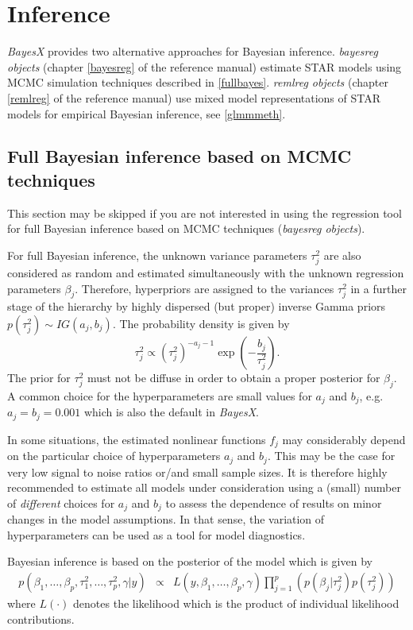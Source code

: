 \documentclass[11pt,a4paper,twoside]{bayesxarticle}
\begin{document}
\section{Inference}
\label{inference}

{\em BayesX} provides two alternative approaches for Bayesian
inference. {\em bayesreg objects} (chapter \ref*{bayesreg} of the
reference manual) estimate STAR models using MCMC simulation
techniques described in \autoref{fullbayes}. {\em remlreg objects}
(chapter \ref*{remlreg} of the reference manual) use mixed model
representations of STAR models for empirical Bayesian inference, see
\autoref{glmmmeth}.



\subsection{Full Bayesian inference based on MCMC techniques}
\label{fullbayes}

This section may be skipped if you are not interested in using the
regression tool for full Bayesian inference based on MCMC techniques
({\em bayesreg objects}).

For full Bayesian inference, the unknown variance parameters
$\tau_j^2$ are also considered as random and estimated
simultaneously with the unknown regression parameters $\beta_j$.
Therefore, hyperpriors are assigned to the variances $\tau^2_j$
in a further stage of the hierarchy by highly dispersed (but
proper) inverse Gamma priors $p(\tau^2_j) \sim IG(a_j,b_j)$. The
probability density is given by
$$
\tau_j^2 \propto (\tau^2_j)^{-a_j-1}
\exp\left(-\frac{b_j}{\tau^2_j}\right).
$$
The prior for $\tau_j^2$ must not be diffuse in order to obtain a
proper posterior for $\beta_j$. A common choice for the
hyperparameters are small values for $a_j$ and $b_j$, e.g.
$a_j=b_j=0.001$ which is also the default in {\em BayesX}.

In some situations, the estimated nonlinear functions $f_j$ may
considerably depend on the particular choice of hyperparameters
$a_j$ and $b_j$. This may be the case for very low signal to noise
ratios or/and small sample sizes. It is therefore highly
recommended to estimate all models under consideration using a
(small) number of {\em different} choices for $a_j$ and $b_j$ to
assess the dependence of results on minor changes in the model
assumptions. In that sense, the variation of hyperparameters can
be used as a tool for model diagnostics.


Bayesian inference is based on the posterior of the model which is
given by
\begin{equation}
\label{posterior}
\begin{array}{lll}
 p(\beta_1,\dots,\beta_p,\tau^2_1,\dots,\tau^2_p,\gamma|y) & \propto & L(y,\beta_1,\dots,\beta_p, \gamma)
\displaystyle \prod_{j=1}^p \left( p(\beta_j|\tau_j^2) p(\tau^2_j)
\right)
 \end{array}
\end{equation}
where  $L(\cdot)$ denotes the likelihood which is the product of
individual likelihood contributions.
\end{document}
